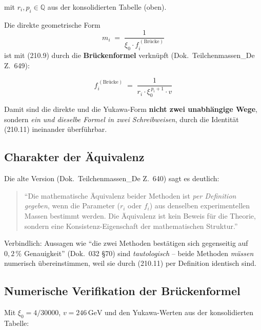 mit $r_i, p_i \in \mathbb{Q}$ aus der konsolidierten Tabelle (oben).

Die direkte geometrische Form
\begin{equation}
  m_i \;=\; \frac{1}{\xi_0 \cdot f_i^{\,(\text{Brücke})}}
  \tag{210.10}
\end{equation}
ist mit (210.9) durch die \textbf{Brückenformel} verknüpft
(Dok.~Teilchenmassen\_De Z.~649):

\begin{equation}
  \boxed{\;f_i^{\,(\text{Brücke})}
  \;=\; \frac{1}{r_i \cdot \xi_0^{\,p_i+1} \cdot v}\;}
  \tag{210.11}
\end{equation}

Damit sind die direkte und die Yukawa-Form \textbf{nicht zwei
unabhängige Wege}, sondern \emph{ein und dieselbe Formel in zwei
Schreibweisen}, durch die Identität (210.11) ineinander überführbar.

\subsection*{Charakter der Äquivalenz}

Die alte Version (Dok.~Teilchenmassen\_De Z.~640) sagt es deutlich:

\begin{quote}
\enquote{Die mathematische Äquivalenz beider Methoden ist \emph{per
Definition gegeben}, wenn die Parameter ($r_i$ oder $f_i$) aus
denselben experimentellen Massen bestimmt werden. Die Äquivalenz ist
kein Beweis für die Theorie, sondern eine Konsistenz-Eigenschaft der
mathematischen Struktur.}
\end{quote}

Verbindlich: Aussagen wie \enquote{die zwei Methoden bestätigen sich
gegenseitig auf $0{,}2\,\%$ Genauigkeit} (Dok.~032 §70) sind
\emph{tautologisch} -- beide Methoden \emph{müssen} numerisch
übereinstimmen, weil sie durch (210.11) per Definition identisch sind.

\subsection*{Numerische Verifikation der Brückenformel}

Mit $\xi_0 = 4/30000$, $v = 246\,\text{GeV}$ und den Yukawa-Werten
aus der konsolidierten Tabelle:

\begin{center}
{\footnotesize
{}
}
\end{center}

